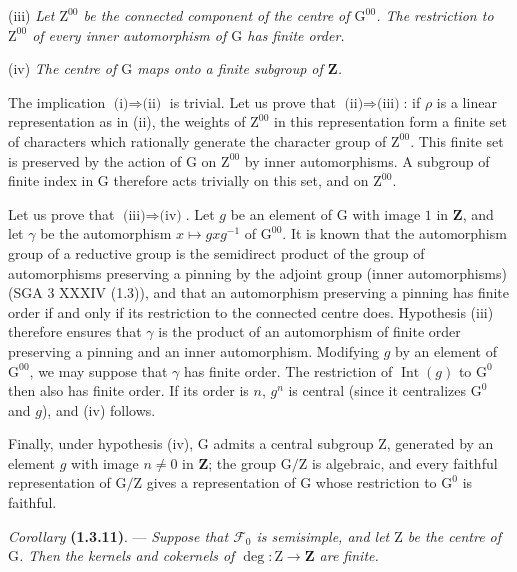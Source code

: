 \documentclass[11pt,leqno]{article}
\begin{document}
(iii) \textit{Let \(\mathrm{Z}^{00}\) be the connected component of the centre of \(\mathrm{G}^{00}\). The restriction to \(\mathrm{Z}^{00}\) of every inner automorphism of \(\mathrm{G}\) has finite order.}

(iv) \textit{The centre of \(\mathrm{G}\) maps onto a finite subgroup of \(\mathbf{Z}\).}

The implication \(\text{(i)}\Rightarrow\text{(ii)}\) is trivial. Let us prove that \(\text{(ii)}\Rightarrow\text{(iii)}\): if \(\rho\) is a linear representation as in (ii), the weights of \(\mathrm{Z}^{00}\) in this representation form a finite set of characters which rationally generate the character group of \(\mathrm{Z}^{00}\). This finite set is preserved by the action of \(\mathrm{G}\) on \(\mathrm{Z}^{00}\) by inner automorphisms. A subgroup of finite index in \(\mathrm{G}\) therefore acts trivially on this set, and on \(\mathrm{Z}^{00}\).

Let us prove that \(\text{(iii)}\Rightarrow\text{(iv)}\). Let \(g\) be an element of \(\mathrm{G}\) with image \(1\) in \(\mathbf{Z}\), and let \(\gamma\) be the automorphism \(x\mapsto gxg^{-1}\) of \(\mathrm{G}^{00}\). It is known that the automorphism group of a reductive group is the semidirect product of the group of automorphisms preserving a pinning by the adjoint group (inner automorphisms) (SGA 3 XXXIV (1.3)), and that an automorphism preserving a pinning has finite order if and only if its restriction to the connected centre does. Hypothesis (iii) therefore ensures that \(\gamma\) is the product of an automorphism of finite order preserving a pinning and an inner automorphism. Modifying \(g\) by an element of \(\mathrm{G}^{00}\), we may suppose that \(\gamma\) has finite order. The restriction of \(\operatorname{Int}(g)\) to \(\mathrm{G}^0\) then also has finite order. If its order is \(n\), \(g^n\) is central (since it centralizes \(\mathrm{G}^0\) and \(g\)), and (iv) follows.

Finally, under hypothesis (iv), \(\mathrm{G}\) admits a central subgroup \(\mathrm{Z}\), generated by an element \(g\) with image \(n\ne0\) in \(\mathbf{Z}\); the group \(\mathrm{G}/\mathrm{Z}\) is algebraic, and every faithful representation of \(\mathrm{G}/\mathrm{Z}\) gives a representation of \(\mathrm{G}\) whose restriction to \(\mathrm{G}^0\) is faithful.

\textit{Corollary} \textbf{(1.3.11)}. — \textit{Suppose that \(\mathscr{F}_0\) is semisimple, and let \(\mathrm{Z}\) be the centre of \(\mathrm{G}\). Then the kernels and cokernels of \(\deg:\mathrm{Z}\to\mathbf{Z}\) are finite.}
\end{document}

